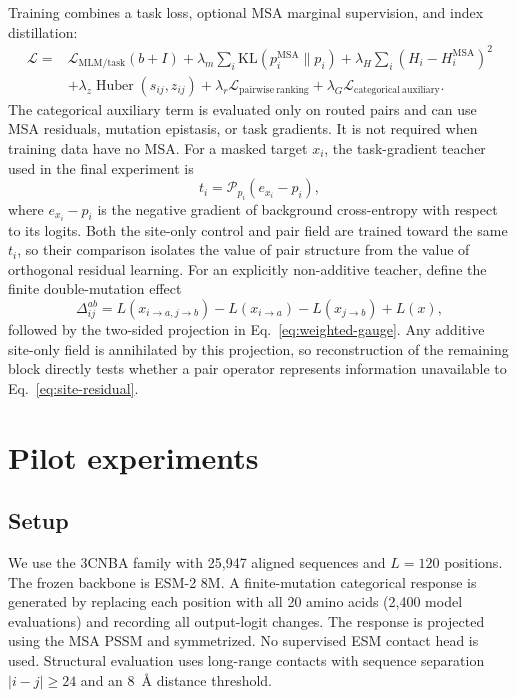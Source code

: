 \documentclass[10pt]{article}
\newcommand{\KL}{\mathrm{KL}}
\begin{document}
Training combines a task loss, optional MSA marginal supervision, and index distillation:
\begin{align}
\mathcal{L}={}&
\mathcal L_{\mathrm{MLM/task}}(b+I)
+\lambda_m\sum_i\KL(p_i^{\mathrm{MSA}}\|p_i)
+\lambda_H\sum_i(H_i-H_i^{\mathrm{MSA}})^2\\
&+\lambda_z\operatorname{Huber}(s_{ij},z_{ij})
+\lambda_r\mathcal L_{\mathrm{pairwise\ ranking}}
+\lambda_G\mathcal L_{\mathrm{categorical\ auxiliary}}.
\end{align}
The categorical auxiliary term is evaluated only on routed pairs and can use MSA residuals,
mutation epistasis, or task gradients.  It is not required when training data have no MSA.
For a masked target $x_i$, the task-gradient teacher used in the final experiment is
\begin{equation}
t_i=\mathcal P_{p_i}\left(e_{x_i}-p_i\right),
\label{eq:task-gradient}
\end{equation}
where $e_{x_i}-p_i$ is the negative gradient of background cross-entropy with respect to its
logits.  Both the site-only control and pair field are trained toward the same $t_i$, so their
comparison isolates the value of pair structure from the value of orthogonal residual learning.
For an explicitly non-additive teacher, define the finite double-mutation effect
\begin{equation}
\Delta_{ij}^{ab}=L(x_{i\to a,j\to b})-L(x_{i\to a})
-L(x_{j\to b})+L(x),
\label{eq:epistasis}
\end{equation}
followed by the two-sided projection in Eq.~\ref{eq:weighted-gauge}.  Any additive site-only
field is annihilated by this projection, so reconstruction of the remaining block directly tests
whether a pair operator represents information unavailable to Eq.~\ref{eq:site-residual}.

\section{Pilot experiments}

\subsection{Setup}

We use the 3CNBA family with 25,947 aligned sequences and $L=120$ positions.  The frozen
backbone is ESM-2 8M.  A finite-mutation categorical response is generated by replacing each
position with all 20 amino acids (2,400 model evaluations) and recording all output-logit
changes.  The response is projected using the MSA PSSM and symmetrized.  No supervised ESM
contact head is used.  Structural evaluation uses long-range contacts with sequence separation
$|i-j|\geq24$ and an 8~\AA{} distance threshold.
\end{document}
